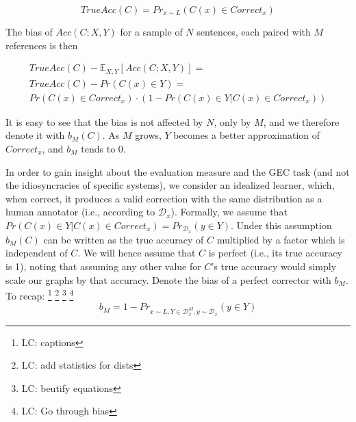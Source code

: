 \documentclass[letter,11pt]{article}
\newcommand{\lc}[1]{\footnote{\color{green}LC: #1}}
\begin{document}
                \begin{equation*}
		  TrueAcc(C) = Pr_{x\sim{L}}\left(C\left(x\right)\in Correct_x\right)
		\end{equation*}
                

                The bias of $Acc(C;X,Y)$ for a sample of $N$ sentences, each paired with $M$ references
                is then

                \begin{footnotesize}
                  \centering
                \begin{align*}
                  TrueAcc(C) - \mathbb{E}_{X,Y}\left[Acc(C;X,Y)\right] = \\
                  TrueAcc(C) - Pr(C(x) \in Y) = \\
                  Pr(C(x) \in Correct_x) \cdot \left(1 - Pr(C(x) \in Y \vert C(x) \in Correct_x) \right)     
                \end{align*}
                \end{footnotesize}

                
		It is easy to see that the bias is not affected by $N$, only by $M$, and we therefore denote it
    with $b_M(C)$. As $M$ grows, $Y$ becomes a better approximation of $Correct_x$, and $b_M$ tends to 0.
		
		In order to gain insight about the evaluation measure and the GEC task
		(and not the idiosyncracies of specific systems), we consider an idealized learner,
		which, when correct, it produces a valid correction with
		the same distribution as a human annotator (i.e., according to $\mathcal{D}_x$).
		Formally, we assume that $Pr(C(x) \in Y \vert C(x) \in Correct_x) = Pr_{\mathcal{D}_x}(y \in Y)$.
		Under this assumption $b_M(C)$ can be written as the true accuracy of $C$ multiplied
		by a factor which is independent of $C$. We will hence assume that $C$ is perfect (i.e., its true
		accuracy is 1), noting that assuming any other value for $C$'s true accuracy would simply scale
		our graphs by that accuracy. Denote the bias of a perfect corrector with $b_M$. To recap:
		\lc{captions}
		\lc{add statistics for dists}
		\lc{beutify equations}
		\lc{Go through bias}
		\begin{equation*}
		b_M = 1 - Pr_{x \sim L, Y \in \mathcal{D}_x^M, y \sim \mathcal{D}_x}(y \in Y)
		\end{equation*}
    
\end{document}
